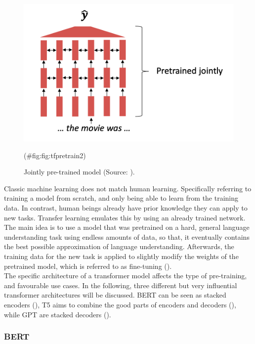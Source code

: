 \documentclass[
]{krantz}
\begin{document}
\begin{figure}

{\centering \includegraphics[width=0.8\linewidth]{./figures/01-01-nlp/transformer_pretrain2_stanford} 

}

\caption{Jointly pre-trained model (Source: \citet{Manning2022}).}(\#fig:fig:tfpretrain2)
\end{figure}



Classic machine learning does not match human learning. Specifically
referring to training a model from scratch, and only being able to learn
from the training data. In contrast, human beings already have prior
knowledge they can apply to new tasks. Transfer learning emulates this
by using an already trained network. The main idea is to use a model
that was pretrained on a hard, general language understanding task using
endless amounts of data, so that, it eventually contains the best
possible approximation of language understanding. Afterwards, the
training data for the new task is applied to slightly modify the weights
of the pretrained model, which is referred to as fine-tuning
(\citep{Manning2022}).\\
The specific architecture of a transformer model affects the type of
pre-training, and favourable use cases. In the following, three
different but very influential transformer architectures will be
discussed. BERT can be seen as stacked encoders (\citep{Devlin2018}), T5 aims
to combine the good parts of encoders and decoders (\citep{Raffel2019}),
while GPT are stacked decoders (\citep{brown2020language}).

\hypertarget{bert}{%
\subsubsection{BERT}\label{bert}}
\end{document}
